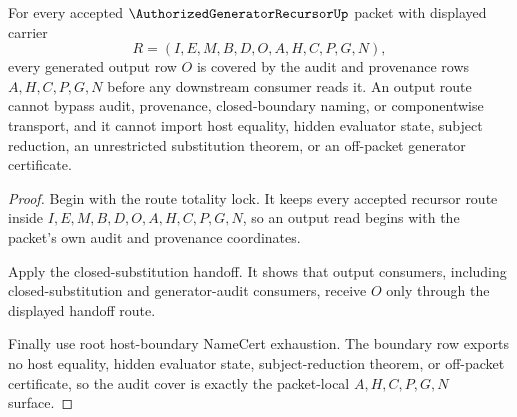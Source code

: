 \begin{theorem}
\label{thm:authorized-generator-recursor-output-route-audit-cover}
For every accepted $\AuthorizedGeneratorRecursorUp$ packet with displayed carrier
$$
R=(I,E,M,B,D,O,A,H,C,P,G,N),
$$
every generated output row $O$ is covered by the audit and provenance rows $A,H,C,P,G,N$ before any downstream consumer reads it. An output route cannot bypass audit, provenance, closed-boundary naming, or componentwise transport, and it cannot import host equality, hidden evaluator state, subject reduction, an unrestricted substitution theorem, or an off-packet generator certificate.
\end{theorem}
\begin{proof}
Begin with the route totality lock. It keeps every accepted recursor route inside $I,E,M,B,D,O,A,H,C,P,G,N$, so an output read begins with the packet's own audit and provenance coordinates.

Apply the closed-substitution handoff. It shows that output consumers, including closed-substitution and generator-audit consumers, receive $O$ only through the displayed handoff route.

Finally use root host-boundary NameCert exhaustion. The boundary row exports no host equality, hidden evaluator state, subject-reduction theorem, or off-packet certificate, so the audit cover is exactly the packet-local $A,H,C,P,G,N$ surface.
\end{proof}

